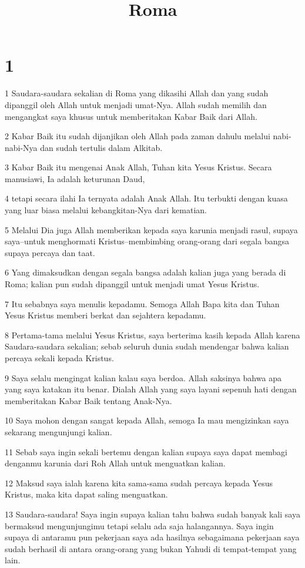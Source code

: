 

\title{Roma}


\chapter{1}

\par 1 Saudara-saudara sekalian di Roma yang dikasihi Allah dan yang sudah dipanggil oleh Allah untuk menjadi umat-Nya. Allah sudah memilih dan mengangkat saya khusus untuk memberitakan Kabar Baik dari Allah.
\par 2 Kabar Baik itu sudah dijanjikan oleh Allah pada zaman dahulu melalui nabi-nabi-Nya dan sudah tertulis dalam Alkitab.
\par 3 Kabar Baik itu mengenai Anak Allah, Tuhan kita Yesus Kristus. Secara manusiawi, Ia adalah keturunan Daud,
\par 4 tetapi secara ilahi Ia ternyata adalah Anak Allah. Itu terbukti dengan kuasa yang luar biasa melalui kebangkitan-Nya dari kematian.
\par 5 Melalui Dia juga Allah memberikan kepada saya karunia menjadi rasul, supaya saya--untuk menghormati Kristus--membimbing orang-orang dari segala bangsa supaya percaya dan taat.
\par 6 Yang dimaksudkan dengan segala bangsa adalah kalian juga yang berada di Roma; kalian pun sudah dipanggil untuk menjadi umat Yesus Kristus.
\par 7 Itu sebabnya saya menulis kepadamu. Semoga Allah Bapa kita dan Tuhan Yesus Kristus memberi berkat dan sejahtera kepadamu.
\par 8 Pertama-tama melalui Yesus Kristus, saya berterima kasih kepada Allah karena Saudara-saudara sekalian; sebab seluruh dunia sudah mendengar bahwa kalian percaya sekali kepada Kristus.
\par 9 Saya selalu mengingat kalian kalau saya berdoa. Allah saksinya bahwa apa yang saya katakan itu benar. Dialah Allah yang saya layani sepenuh hati dengan memberitakan Kabar Baik tentang Anak-Nya.
\par 10 Saya mohon dengan sangat kepada Allah, semoga Ia mau mengizinkan saya sekarang mengunjungi kalian.
\par 11 Sebab saya ingin sekali bertemu dengan kalian supaya saya dapat membagi denganmu karunia dari Roh Allah untuk menguatkan kalian.
\par 12 Maksud saya ialah karena kita sama-sama sudah percaya kepada Yesus Kristus, maka kita dapat saling menguatkan.
\par 13 Saudara-saudara! Saya ingin supaya kalian tahu bahwa sudah banyak kali saya bermaksud mengunjungimu tetapi selalu ada saja halangannya. Saya ingin supaya di antaramu pun pekerjaan saya ada hasilnya sebagaimana pekerjaan saya sudah berhasil di antara orang-orang yang bukan Yahudi di tempat-tempat yang lain.
